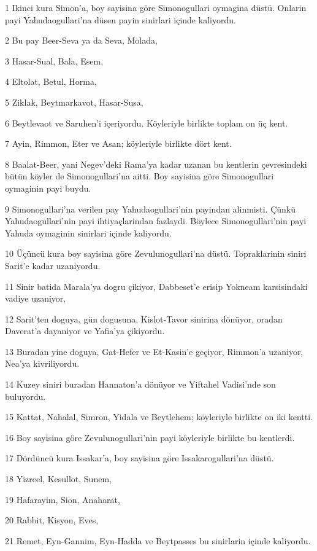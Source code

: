\par 1 Ikinci kura Simon'a, boy sayisina göre Simonogullari oymagina düstü. Onlarin payi Yahudaogullari'na düsen payin sinirlari içinde kaliyordu.
\par 2 Bu pay Beer-Seva ya da Seva, Molada,
\par 3 Hasar-Sual, Bala, Esem,
\par 4 Eltolat, Betul, Horma,
\par 5 Ziklak, Beytmarkavot, Hasar-Susa,
\par 6 Beytlevaot ve Saruhen'i içeriyordu. Köyleriyle birlikte toplam on üç kent.
\par 7 Ayin, Rimmon, Eter ve Asan; köyleriyle birlikte dört kent.
\par 8 Baalat-Beer, yani Negev'deki Rama'ya kadar uzanan bu kentlerin çevresindeki bütün köyler de Simonogullari'na aitti. Boy sayisina göre Simonogullari oymaginin payi buydu.
\par 9 Simonogullari'na verilen pay Yahudaogullari'nin payindan alinmisti. Çünkü Yahudaogullari'nin payi ihtiyaçlarindan fazlaydi. Böylece Simonogullari'nin payi Yahuda oymaginin sinirlari içinde kaliyordu.
\par 10 Üçüncü kura boy sayisina göre Zevulunogullari'na düstü. Topraklarinin siniri Sarit'e kadar uzaniyordu.
\par 11 Sinir batida Marala'ya dogru çikiyor, Dabbeset'e erisip Yokneam karsisindaki vadiye uzaniyor,
\par 12 Sarit'ten doguya, gün dogusuna, Kislot-Tavor sinirina dönüyor, oradan Daverat'a dayaniyor ve Yafia'ya çikiyordu.
\par 13 Buradan yine doguya, Gat-Hefer ve Et-Kasin'e geçiyor, Rimmon'a uzaniyor, Nea'ya kivriliyordu.
\par 14 Kuzey siniri buradan Hannaton'a dönüyor ve Yiftahel Vadisi'nde son buluyordu.
\par 15 Kattat, Nahalal, Simron, Yidala ve Beytlehem; köyleriyle birlikte on iki kentti.
\par 16 Boy sayisina göre Zevulunogullari'nin payi köyleriyle birlikte bu kentlerdi.
\par 17 Dördüncü kura Issakar'a, boy sayisina göre Issakarogullari'na düstü.
\par 18 Yizreel, Kesullot, Sunem,
\par 19 Hafarayim, Sion, Anaharat,
\par 20 Rabbit, Kisyon, Eves,
\par 21 Remet, Eyn-Gannim, Eyn-Hadda ve Beytpasses bu sinirlarin içinde kaliyordu.
